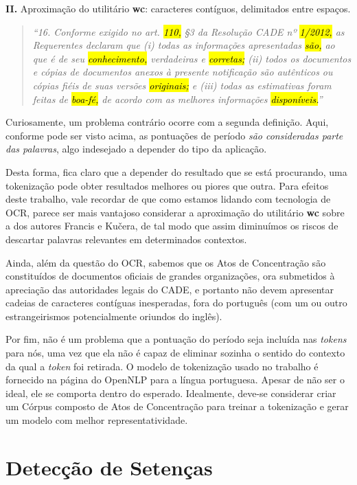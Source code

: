 \documentclass[11pt]{report}
\newcommand{\quotes}[1]{``#1''}
\begin{document}
\textbf{II.} Aproximação do utilitário \textbf{wc}: caracteres contíguos, delimitados entre espaços.

\begin{quote}
  \textit{\quotes{16. Conforme exigido no art. \hl{110,} §3 da Resolução CADE nº \hl{1/2012,} as Requerentes declaram que (i) todas as informações apresentadas \hl{\mbox{são,}} ao que é de seu
  \hl{conhecimento,} verdadeiras e \hl{corretas;} (ii) todos os documentos e cópias de documentos anexos à presente notificação são autênticos ou cópias fiéis de suas versões \hl{originais;}
  e (iii) todas as estimativas foram feitas de \hl{\mbox{boa-fé,}} de acordo com as melhores informações \hl{\mbox{disponíveis.}}}}
\end{quote}

Curiosamente, um problema contrário ocorre com a segunda definição. Aqui, conforme pode ser visto acima, as pontuações de período \textit{são consideradas parte das palavras}, algo
indesejado a depender do tipo da aplicação.

Desta forma, fica claro que a depender do resultado que se está procurando, uma tokenização pode obter resultados melhores ou piores que outra. Para efeitos deste trabalho,
vale recordar de que como estamos lidando com tecnologia de OCR, parece ser mais vantajoso considerar a aproximação do utilitário \textbf{wc} sobre a dos autores
Francis e Kučera, de tal modo que assim diminuímos os riscos de descartar palavras relevantes em determinados contextos.

Ainda, além da questão do OCR, sabemos que os Atos de Concentração são constituídos de documentos oficiais de grandes organizações, ora submetidos à apreciação das
autoridades legais do CADE, e portanto não devem apresentar cadeias de caracteres contíguas inesperadas, fora do português (com um ou outro estrangeirismos
potencialmente oriundos do inglês).

Por fim, não é um problema que a pontuação do período seja incluída nas \textit{tokens} para nós, uma vez que ela não é capaz de eliminar sozinha o sentido do contexto da qual
a \textit{token} foi retirada. O modelo de tokenização usado no trabalho é fornecido na página do OpenNLP para a língua portuguesa. Apesar de não ser o ideal, ele se comporta
dentro do esperado. Idealmente, deve-se considerar criar um Córpus composto de Atos de Concentração para treinar a tokenização e gerar um modelo com melhor representatividade.

\section{Detecção de Setenças}
\end{document}
